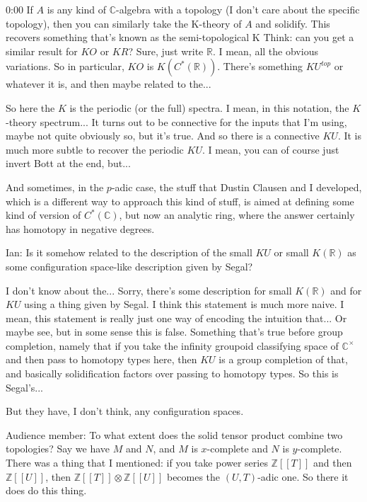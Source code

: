 \begin{unfinished}{0:00}
If $A$ is any kind of $\mathbb{C}$-algebra with a topology (I don't care about the specific topology), then you can similarly take the K-theory of $A$ and solidify. This recovers something that's known as the semi-topological K
Think: can you get a similar result for $KO$ or $KR$? Sure, just write $\mathbb{R}$. I mean, all the obvious variations. So in particular, $KO$ is $K(C^*(\mathbb{R}))$. There's something $KU^{top}$ or whatever it is, and then maybe related to the...

So here the $K$ is the periodic (or the full) spectra. I mean, in this notation, the $K$-theory spectrum... It turns out to be connective for the inputs that I'm using, maybe not quite obviously so, but it's true. And so there is a connective $KU$. It is much more subtle to recover the periodic $KU$. I mean, you can of course just invert Bott at the end, but...

And sometimes, in the $p$-adic case, the stuff that Dustin Clausen and I developed, which is a different way to approach this kind of stuff, is aimed at defining some kind of version of $C^*(\mathbb{C})$, but now an analytic ring, where the answer certainly has homotopy in negative degrees.

Ian: Is it somehow related to the description of the small $KU$ or small $K(\mathbb{R})$ as some configuration space-like description given by Segal?

I don't know about the... Sorry, there's some description for small $K(\mathbb{R})$ and for $KU$ using a thing given by Segal. I think this statement is much more naive. I mean, this statement is really just one way of encoding the intuition that... Or maybe see, but in some sense this is false. Something that's true before group completion, namely that if you take the infinity groupoid classifying space of $\mathbb{C}^\times$ and then pass to homotopy types here, then $KU$ is a group completion of that, and basically solidification factors over passing to homotopy types. So this is Segal's...

But they have, I don't think, any configuration spaces.

Audience member: To what extent does the solid tensor product combine two topologies? Say we have $M$ and $N$, and $M$ is $x$-complete and $N$ is $y$-complete. There was a thing that I mentioned: if you take power series $\mathbb{Z}[[T]]$ and then $\mathbb{Z}[[U]]$, then $\mathbb{Z}[[T]] \otimes \mathbb{Z}[[U]]$ becomes the $(U,T)$-adic one. So there it does do this thing.


\end{unfinished}

